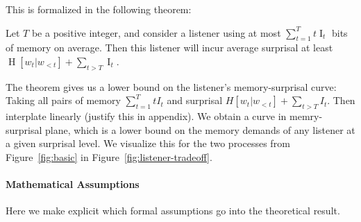 This is formalized in the following theorem:

\begin{thm}\label{prop:suboptimal}
Let $T$ be a positive integer, and consider a listener using at most $\sum_{t=1}^T t \operatorname{I}_t$ bits of memory on average.
Then this listener will incur average surprisal at least
$\operatorname{H}[w_t|w_{<t}] + \sum_{t > T} \operatorname{I}_t$.
\end{thm}






The theorem gives us a lower bound on the listener's memory-surprisal curve: Taking all pairs of memory $\sum_{t=1}^T t I_t$ and surprisal $H[w_t|w_{<t}] + \sum_{t > T} I_t$.
Then interplate linearly (justify this in appendix).
We obtain a curve in memry-surprisal plane, which is a lower bound on the memory demands of any listener at a given surprisal level.
We visualize this for the two processes from Figure~\ref{fig:basic} in Figure~\ref{fig:listener-tradeoff}.



\paragraph{Mathematical Assumptions}
Here we make explicit which formal assumptions go into the theoretical result.

